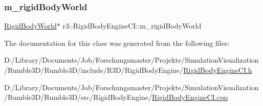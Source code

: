 \mbox{\label{classr3_1_1_rigid_body_engine_c_i_afd7ae3fcba8b88ec6c31f2df56aae3f6}} 
\subsubsection{\texorpdfstring{m\+\_\+rigid\+Body\+World}{m\_rigidBodyWorld}}
{\footnotesize\ttfamily \mbox{\hyperlink{classr3_1_1_rigid_body_world}{Rigid\+Body\+World}}$\ast$ r3\+::\+Rigid\+Body\+Engine\+C\+I\+::m\+\_\+rigid\+Body\+World\hspace{0.3cm}{\ttfamily [protected]}}



The documentation for this class was generated from the following files\+:\begin{DoxyCompactItemize}
\item 
D\+:/\+Library/\+Documents/\+Job/\+Forschungsmaster/\+Projekte/\+Simulation\+Visualization/\+Rumble3\+D/\+Rumble3\+D/include/\+R3\+D/\+Rigid\+Body\+Engine/\mbox{\hyperlink{_rigid_body_engine_c_i_8h}{Rigid\+Body\+Engine\+C\+I.\+h}}\item 
D\+:/\+Library/\+Documents/\+Job/\+Forschungsmaster/\+Projekte/\+Simulation\+Visualization/\+Rumble3\+D/\+Rumble3\+D/src/\+Rigid\+Body\+Engine/\mbox{\hyperlink{_rigid_body_engine_c_i_8cpp}{Rigid\+Body\+Engine\+C\+I.\+cpp}}\end{DoxyCompactItemize}
